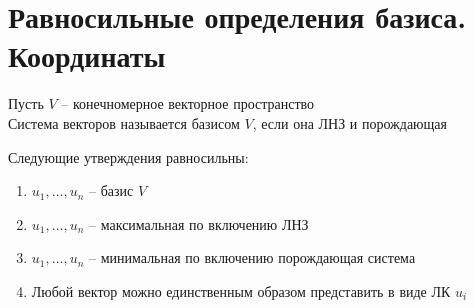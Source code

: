\section{Равносильные определения базиса. Координаты}

\begin{definition}
	Пусть $V$ -- конечномерное векторное пространство \\
    Система векторов называется базисом $V$, если она ЛНЗ и порождающая
\end{definition}

\begin{theorem}
	Следующие утверждения равносильны:
    \begin{enumerate}
		\item \label{it:81} $u_1, ..., u_n$ -- базис $V$
        \item \label{it:82} $u_1, ..., u_n$ -- максимальная по включению ЛНЗ
        \item \label{it:83} $u_1, ..., u_n$ -- минимальная по включению порождающая система
        \item \label{it:84} Любой вектор можно единственным образом представить в виде ЛК $u_i$
    \end{enumerate}
\end{theorem}

